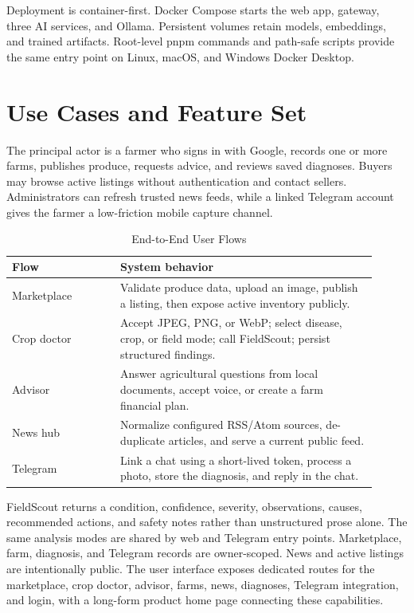 \documentclass[10pt,journal]{IEEEtran}
\begin{document}
Deployment is container-first. Docker Compose starts the web app, gateway, three
AI services, and Ollama. Persistent volumes retain models, embeddings, and trained
artifacts. Root-level pnpm commands and path-safe scripts provide the same entry
point on Linux, macOS, and Windows Docker Desktop.

\newpage
\section{Use Cases and Feature Set}
The principal actor is a farmer who signs in with Google, records one or more
farms, publishes produce, requests advice, and reviews saved diagnoses. Buyers may
browse active listings without authentication and contact sellers. Administrators
can refresh trusted news feeds, while a linked Telegram account gives the farmer a
low-friction mobile capture channel.

\begin{table}[h]
\caption{End-to-End User Flows}
\centering
\begin{tabular}{p{0.27\linewidth}p{0.64\linewidth}}
\toprule
Flow & System behavior \\
\midrule
Marketplace & Validate produce data, upload an image, publish a listing, then expose active inventory publicly. \\
Crop doctor & Accept JPEG, PNG, or WebP; select disease, crop, or field mode; call FieldScout; persist structured findings. \\
Advisor & Answer agricultural questions from local documents, accept voice, or create a farm financial plan. \\
News hub & Normalize configured RSS/Atom sources, de-duplicate articles, and serve a current public feed. \\
Telegram & Link a chat using a short-lived token, process a photo, store the diagnosis, and reply in the chat. \\
\bottomrule
\end{tabular}
\end{table}

FieldScout returns a condition, confidence, severity, observations, causes,
recommended actions, and safety notes rather than unstructured prose alone. The
same analysis modes are shared by web and Telegram entry points. Marketplace,
farm, diagnosis, and Telegram records are owner-scoped. News and active listings
are intentionally public. The user interface exposes dedicated routes for the
marketplace, crop doctor, advisor, farms, news, diagnoses, Telegram integration,
and login, with a long-form product home page connecting these capabilities.
\end{document}

